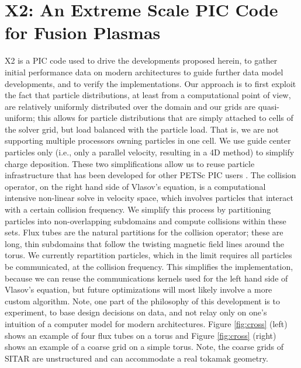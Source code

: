 \documentclass[review]{siamart}
\begin{document}
\section{X2: An Extreme Scale PIC Code for Fusion Plasmas}

X2 is a PIC code used to drive the developments proposed herein, to gather initial performance data on modern architectures to guide further data model developments, and to verify the implementations.
Our approach is to first exploit the fact that particle distributions, at least from a computational point of view, are relatively uniformly distributed over the domain and our grids are quasi-uniform; this allows for particle distributions that are simply attached to cells of the solver grid, but load balanced with the particle load.
That is, we are not supporting multiple processors owning particles in one cell.
We use guide center particles only (i.e., only a parallel velocity, resulting in a 4D method) to simplify charge deposition.
These two simplifications allow us to reuse particle infrastructure that has been developed for other PETSc PIC users \cite{may2014ptatin}.
The collision operator, on the right hand side of Vlasov's equation, is a computational intensive non-linear solve in velocity space, which involves particles that interact with a certain collision frequency.
We simplify this process by partitioning particles into non-overlapping subdomains and compute collisions within these sets.
Flux tubes are the natural partitions for the collision operator; these are long, thin subdomains that follow the twisting magnetic field lines around the torus.
We currently repartition particles, which in the limit requires all particles be communicated, at the collision frequency.
This simplifies the implementation, because we can reuse the communications kernels used for the left hand side of Vlasov's equation, but future optimizations will most likely involve a more custom algorithm.
Note, one part of the philosophy of this development is to experiment, to base design decisions on data, and not relay only on one's intuition of a computer model for modern architectures.
Figure \ref{fig:cross} (left) shows an example of four flux tubes on a torus and Figure \ref{fig:cross} (right) shows an example of a coarse grid on a simple torus.
Note, the coarse grids of SITAR are unstructured and can accommodate a real tokamak geometry.
\end{document}

